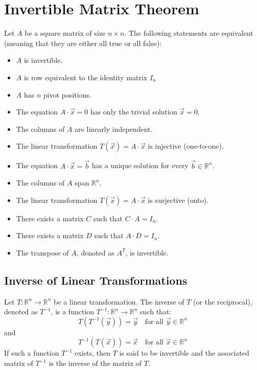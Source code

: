 \section{Invertible Matrix Theorem}
\begin{theorem}
    Let $A$ be a square matrix of size $n \times n$. The following statements are equivalent (meaning that they are either all true or all false):
    \begin{itemize}[itemsep=1pt,label=$\circ$]
        \item $A$ is invertible.
        \item $A$ is row equivalent to the identity matrix $I_n$
        \item $A$ has $n$ pivot positions.
        \item The equation $A \cdot \vec{x} = 0$ has only the trivial solution $\vec{x} = 0$.
        \item The columns of $A$ are linearly independent.
        \item The linear transformation $T(\vec{x}) = A \cdot \vec{x}$ is injective (one-to-one).
        \item The equation $A \cdot \vec{x} = \vec{b}$ has a unique solution for every $\vec{b} \in \mathbb{R}^n$.
        \item The columns of $A$ span $\mathbb{R}^n$.
        \item The linear transformation $T(\vec{x}) = A \cdot \vec{x}$ is surjective (onto).
        \item There exists a matrix $C$ such that $C \cdot A = I_n$.
        \item There exists a matrix $D$ such that $A \cdot D = I_n$.
        \item The transpose of $A$, denoted as $A^T$, is invertible.
    \end{itemize}
\end{theorem}

\subsection{Inverse of Linear Transformations}
\begin{definition}
    Let \( T: \mathbb{R}^n \to \mathbb{R}^n \) be a linear transformation. The inverse of \( T \) (or the reciprocal), denoted as \( T^{-1} \), is a function \( T^{-1}: \mathbb{R}^n \to \mathbb{R}^n \) such that:
    \[
        T(T^{-1}(\vec{y})) = \vec{y} \quad \text{for all } \vec{y} \in \mathbb{R}^n
    \]
    and
    \[
        T^{-1}(T(\vec{x})) = \vec{x} \quad \text{for all } \vec{x} \in \mathbb{R}^n
    \]
    If such a function \( T^{-1} \) exists, then \( T \) is said to be invertible and the associated matrix of \( T^{-1} \) is the inverse of the matrix of \( T \).
\end{definition}